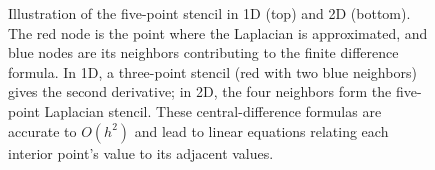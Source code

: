 \documentclass[a4paper,11pt]{report}
\begin{document}
\begin{enumerate}
\begin{figure}[H]
              \caption{Illustration of the five-point stencil in 1D (top) and 2D (bottom). The red node is the point where the Laplacian is approximated, and blue nodes are its neighbors contributing to the finite difference formula. In 1D, a three-point stencil (red with two blue neighbors) gives the second derivative; in 2D, the four neighbors form the five-point Laplacian stencil. These central-difference formulas are accurate to $O(h^2)$ and lead to linear equations relating each interior point's value to its adjacent values.}
          \end{figure}


\end{enumerate}
\end{document}
